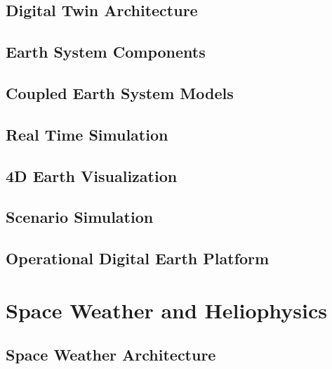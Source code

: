 \documentclass[11pt,a4paper,oneside]{report}
\begin{document}
\chapter{Digital Twin Architecture}



\chapter{Earth System Components}



\chapter{Coupled Earth System Models}



\chapter{Real Time Simulation}



\chapter{4D Earth Visualization}



\chapter{Scenario Simulation}



\chapter{Operational Digital Earth Platform}



\part{Space Weather and Heliophysics}


\chapter{Space Weather Architecture}

\end{document}

